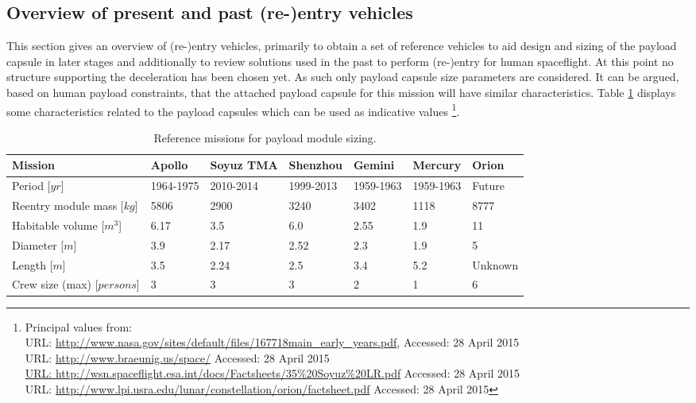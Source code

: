 \subsection{Overview of present and past (re-)entry vehicles}\label{cha:past missions}
This section gives an overview of (re-)entry vehicles, primarily to obtain a set of reference vehicles to aid design and sizing of the payload capsule in later stages and additionally to review solutions used in the past to perform (re-)entry for human spaceflight. At this point no structure supporting the deceleration has been chosen yet. As such only payload capsule size parameters are considered. It can be argued, based on human payload constraints, that the attached payload capsule for this mission will have similar characteristics. Table \ref{tab:refmis} displays some characteristics related to the payload capsules which can be used as indicative values \footnote{Principal values from: \\
URL: \url{http://www.nasa.gov/sites/default/files/167718main\_early\_years.pdf},  Accessed: 28 April 2015 \\ URL: \url{http://www.braeunig.us/space/} Accessed: 28 April 2015 \\ \url{URL: http://wsn.spaceflight.esa.int/docs/Factsheets/35\%20Soyuz\%20LR.pdf} Accessed: 28 April 2015 \\
URL: \url{http://www.lpi.usra.edu/lunar/constellation/orion/factsheet.pdf} Accessed: 28 April 2015}. 

\begin{table}[H]
	\caption[Reference missions for payload module sizing]{Reference missions for payload module sizing.}
		\begin{tabular}{|p{}|p{}|p{}|p{}|p{}|p{}|p{}|} %
			\hline
			Mission 						& Apollo & 	Soyuz TMA &	Shenzhou & Gemini & Mercury & Orion \\ \hline \hline
			Period [$yr$]					&	1964-1975	& 	2010-2014&	1999-2013 &   1959-1963  & 1959-1963 & Future \\ \hline
			Reentry module mass [$kg$]  	&	5806& 	2900 &	3240 & 3402 & 1118 & 8777 \\ \hline
			Habitable volume [$m^3$]		&	6.17& 	3.5  &	6.0  & 2.55 & 1.9 & 11   \\ \hline
			Diameter [$m$]			 		&	3.9 & 	2.17  &	2.52 & 2.3 & 1.9 & 5   \\ \hline
			Length  [$m$]			 		&	3.5 & 	2.24  &	2.5  & 3.4 &  5.2 & Unknown  \\ \hline
			Crew size (max) [$persons$]		&	3   & 	3     &	3    & 2   &  1   & 6   \\ \hline
		\end{tabular}
    \label{tab:refmis}
\end{table}


